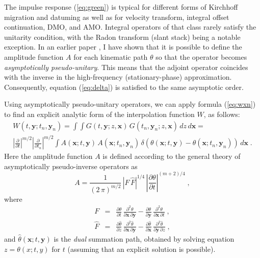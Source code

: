 The impulse response (\ref{eq:green}) is typical for different forms
of Kirchhoff migration and datuming as well as for velocity transform,
integral offset continuation, DMO, and AMO. Integral operators of that
class rarely satisfy the unitarity condition, with the Radon transform
(slant stack) being a notable exception. In an earlier paper
\cite[]{Fomel.sep.92.267}, I have shown that it is possible to define
the amplitude function $A$ for each kinematic path $\theta$ so that
the operator becomes \emph{asymptotically pseudo-unitary}. This means
that the adjoint operator coincides with the inverse in the
high-frequency (stationary-phase) approximation.  Consequently,
equation (\ref{eq:delta}) is satisfied to the same asymptotic order.

Using asymptotically pseudo-unitary operators, we can apply formula
(\ref{eq:wxn}) to find an explicit analytic form of the interpolation
function $W$, as follows:
\begin{eqnarray}
  \label{eq:apu}
  W (t, \mathbf{y}; t_n, \mathbf{y}_n) =  \int\!\!\int
  G (t, \mathbf{y}; z,\mathbf{x})\, G(t_n,\mathbf{y}_n;z,\mathbf{x})\,
  d z \, d \mathbf{x} =
  \nonumber \\
  \left|\frac{\partial}{\partial t}\right|^{m/2}
  \left|\frac{\partial}{\partial t_n}\right|^{m/2} \int
  A (\mathbf{x};t,\mathbf{y}) \, A (\mathbf{x};t_n,\mathbf{y}_n)\,
  \delta \left(\theta(\mathbf{x};t  ,\mathbf{y}  ) -
               \theta(\mathbf{x};t_n,\mathbf{y}_n) \right) \,
             d \mathbf{x}\;.
\end{eqnarray}
Here the amplitude function $A$ is defined according to the general
theory of asymptotically pseudo-inverse operators as
\begin{equation}
A = {\frac{1}{\left(2\,\pi\right)^{m/2}}}\,
{\left|F\,\widehat{F}\right|^{1/4}\,
\left|\frac{\partial \theta}{\partial t}\right|^{(m+2)/4}}\;,
\label{eq:weight}
\end{equation}
where
\begin{eqnarray}
F & = & \frac{\partial \theta}{\partial t}\,
\frac{\partial^2 \theta}{\partial \mathbf{x}\, \partial \mathbf{y}} -
\frac{\partial \theta}{\partial \mathbf{y}}\,
\frac{\partial^2 \theta}{\partial \mathbf{x}\, \partial t}\;,
 \\
\widehat{F} & = & \frac{\partial \widehat{\theta}}{\partial z}\,
\frac{\partial^2 \widehat{\theta}}{\partial \mathbf{x}\, \partial \mathbf{y}} -
\frac{\partial \widehat{\theta}}{\partial \mathbf{x}}\,
\frac{\partial^2 \widehat{\theta}}{\partial \mathbf{y}\, \partial z}\;,
\end{eqnarray}
and $\widehat{\theta} (\mathbf{x};t,\mathbf{y})$ is the \emph{dual}
summation path, obtained by solving equation $z=\theta(x;t,y)$ for $t$
(assuming that an explicit solution is possible).

